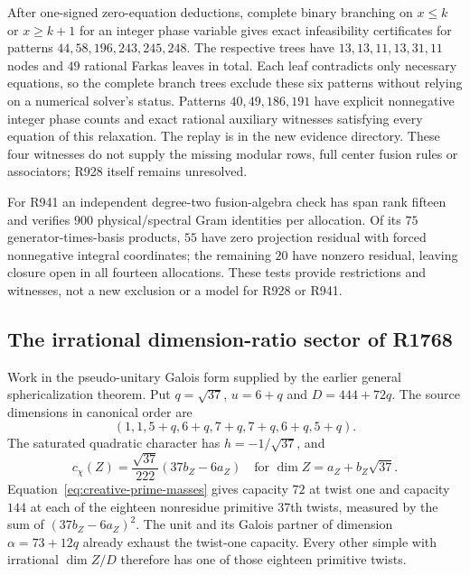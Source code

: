 After one-signed zero-equation deductions, complete binary branching on
$x\leq k$ or $x\geq k+1$ for an integer phase variable gives exact
infeasibility certificates for patterns $44,58,196,243,245,248$.
The respective trees have $13,13,11,13,31,11$ nodes and $49$ rational
Farkas leaves in total. Each leaf contradicts only necessary equations,
so the complete branch trees exclude these six patterns without relying
on a numerical solver's status. Patterns $40,49,186,191$ have explicit
nonnegative integer phase counts and exact rational auxiliary witnesses
satisfying every equation of this relaxation. The replay is
 in the new evidence directory.
These four witnesses do not supply the missing modular rows, full center
fusion rules or associators; R928 itself remains unresolved.

For R941 an independent degree-two fusion-algebra check has span rank
fifteen and verifies $900$ physical/spectral Gram identities per
allocation. Of its $75$ generator-times-basis products, $55$ have
zero projection residual with forced nonnegative integral coordinates;
the remaining $20$ have nonzero residual, leaving closure open in all
fourteen allocations. These tests provide restrictions and witnesses,
not a new exclusion or a model for R928 or R941.

\subsection{The irrational dimension-ratio sector of R1768}
\label{subsec:creative-r1768}

Work in the pseudo-unitary Galois form supplied by the earlier general
sphericalization theorem. Put $q=\sqrt{37}$, $u=6+q$ and
$D=444+72q$. The source dimensions in canonical order are
\[
 (1,1,5+q,6+q,7+q,7+q,6+q,5+q).
\]
The saturated quadratic character has $h=-1/\sqrt{37}$, and
\[
 c_\chi(Z)=\frac{\sqrt{37}}{222}(37b_Z-6a_Z)
       \quad\text{for }\dim Z=a_Z+b_Z\sqrt{37}.
\]
Equation~\eqref{eq:creative-prime-masses} gives capacity $72$ at twist
one and capacity $144$ at each of the eighteen nonresidue primitive
37th twists, measured by the sum of $(37b_Z-6a_Z)^2$.
The unit and its Galois partner of dimension $\alpha=73+12q$ already
exhaust the twist-one capacity. Every other simple with irrational
$\dim Z/D$ therefore has one of those eighteen primitive twists.

